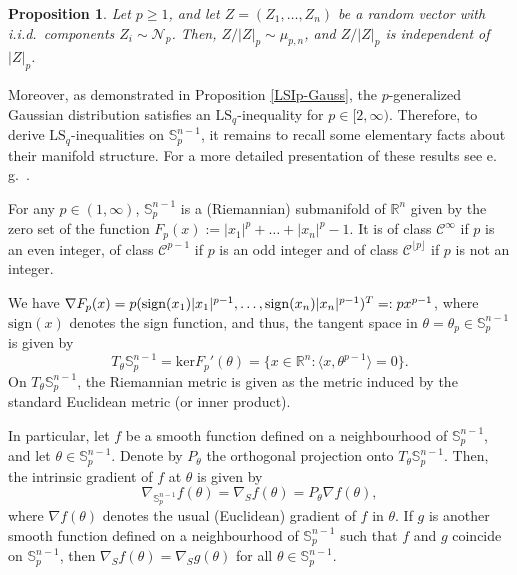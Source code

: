 \documentclass[a4paper,12pt]{amsart}
\numberwithin{equation}{section}
\newtheorem{proposition}[satz]{Proposition}
\theoremstyle{remark}
\def\R{{\mathbb R}}
\def\S{{\mathbb S}}
\def\sign{{\rm sign}}
\begin{document}
\begin{proposition}\label{p-GaussCone}
    Let $p \ge 1$, and let $Z = (Z_1,\ldots,Z_n)$ be a random vector with i.i.d.\ components $Z_i \sim \mathcal{N}_p$. Then, $Z/\lvert Z \rvert_p \sim \mu_{p,n}$, and $Z/\lvert Z \rvert_p$ is independent of $\lvert Z \rvert_p$.
\end{proposition}

Moreover, as demonstrated in Proposition \ref{LSIp-Gauss}, the $p$-generalized Gaussian distribution satisfies an $\mathrm{LS}_q$-inequality for $p \in [2,\infty)$. Therefore, to derive $\mathrm{LS}_q$-inequalities on $\S_p^{n-1}$, it remains to recall some elementary facts about their manifold structure. For a more detailed presentation of these results see e.\,g.\ \cite[Sect.\ 2\&3]{Sat23}.

For any $p \in (1,\infty)$, $\S_p^{n-1}$ is a (Riemannian) submanifold of $\R^n$ given by the zero set of the function $F_p(x) := |x_1|^p + \ldots + |x_n|^p - 1$. It is of class $\mathcal{C}^\infty$ if $p$ is an even integer, of class $\mathcal{C}^{p-1}$ if $p$ is an odd integer and of class $\mathcal{C}^{\lfloor p \rfloor}$ if $p$ is not an integer.

We have $\nabla F_p(x) = p(\sign(x_1)|x_1|^{p-1}, \ldots, \sign(x_n)|x_n|^{p-1})^T =: px^{p-1}$, where $\mathrm{sign}(x)$ denotes the sign function, and thus, the tangent space in $\theta = \theta_p \in \S_p^{n-1}$ is given by
\[
T_\theta\S_p^{n-1} = \mathrm{ker} F_p'(\theta) = \{ x \in \R^n \colon \langle x, \theta^{p-1} \rangle = 0\}.
\]
On $T_\theta\S_p^{n-1}$, the Riemannian metric is given as the metric induced by the standard Euclidean metric (or inner product).

In particular, let $f$ be a smooth function defined on a neighbourhood of $\S_p^{n-1}$, and let $\theta \in \S_p^{n-1}$. Denote by $P_\theta$ the orthogonal projection onto $T_\theta\S_p^{n-1}$. Then, the intrinsic gradient of $f$ at $\theta$ is given by
\[
\nabla_{\S_p^{n-1}} f(\theta) = \nabla_S f(\theta) = P_\theta \nabla f(\theta),
\]
where $\nabla f(\theta)$ denotes the usual (Euclidean) gradient of $f$ in $\theta$. If $g$ is another smooth function defined on a neighbourhood of $\S_p^{n-1}$ such that $f$ and $g$ coincide on $\S_p^{n-1}$, then $\nabla_S f(\theta) = \nabla_S g(\theta)$ for all $\theta \in \S_p^{n-1}$.
\end{document}
